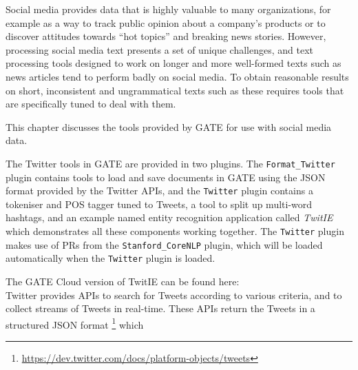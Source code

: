 %
%
%


\nnormalsize

Social media provides data that is highly valuable to many organizations, for
example as a way to track public opinion about a company's products or to
discover attitudes towards ``hot topics'' and breaking news stories.  However,
processing social media text presents a set of unique challenges, and text
processing tools designed to work on longer and more well-formed texts such as
news articles tend to perform badly on social media.  To obtain reasonable
results on short, inconsistent and ungrammatical texts such as these requires
tools that are specifically tuned to deal with them.

This chapter discusses the tools provided by GATE for use with social media
data.


The Twitter tools in GATE are provided in two plugins.  The
\verb!Format_Twitter! plugin contains tools to load and save documents in GATE
using the JSON format provided by the Twitter APIs, and the \verb!Twitter!
plugin contains a tokeniser and POS tagger tuned to Tweets, a tool to split
up multi-word hashtags, and an example named entity recognition application
called {\em TwitIE} which demonstrates all these components working together.
The \verb!Twitter! plugin makes use of PRs from the \verb!Stanford_CoreNLP!
plugin, which will be loaded automatically when the \verb!Twitter! plugin is
loaded.

The GATE Cloud version of TwitIE can be found here: \\
%
Twitter provides APIs to search for Tweets according to various criteria, and
to collect streams of Tweets in real-time.  These APIs return the Tweets in a
structured JSON format%
\footnote{\url{https://dev.twitter.com/docs/platform-objects/tweets}} which

